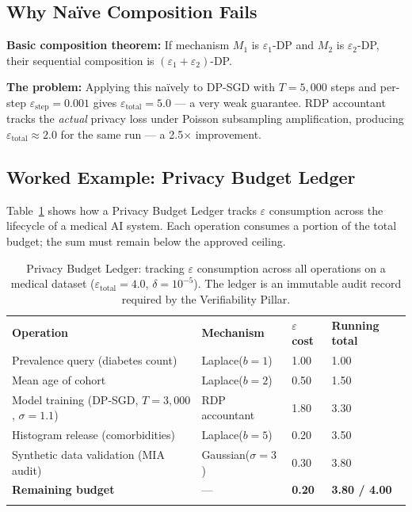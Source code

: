 \subsection{Why Naïve Composition Fails}
\label{subsec:naive_composition}

\textbf{Basic composition theorem:} If mechanism $M_1$ is $\varepsilon_1$-DP and $M_2$ is $\varepsilon_2$-DP, their sequential composition is $(\varepsilon_1 + \varepsilon_2)$-DP.

\textbf{The problem:} Applying this naïvely to DP-SGD with $T = 5{,}000$ steps and per-step $\varepsilon_{\text{step}} = 0.001$ gives $\varepsilon_{\text{total}} = 5.0$ — a very weak guarantee. RDP accountant tracks the \emph{actual} privacy loss under Poisson subsampling amplification, producing $\varepsilon_{\text{total}} \approx 2.0$ for the same run — a 2.5$\times$ improvement.

\subsection{Worked Example: Privacy Budget Ledger}
\label{subsec:budget_ledger}

Table~\ref{tab:budget_ledger} shows how a Privacy Budget Ledger tracks $\varepsilon$ consumption across the lifecycle of a medical AI system. Each operation consumes a portion of the total budget; the sum must remain below the approved ceiling.

\begin{table}[ht]
\centering
\caption{Privacy Budget Ledger: tracking $\varepsilon$ consumption across all operations on a medical dataset ($\varepsilon_{\mathrm{total}} = 4.0$, $\delta = 10^{-5}$). The ledger is an immutable audit record required by the Verifiability Pillar.}
\label{tab:budget_ledger}
\renewcommand{\arraystretch}{1.3}
\begin{tabular}{p{4.0cm} p{2.8cm} p{1.8cm} p{2.0cm}}
\hline\noalign{\smallskip}
\textbf{Operation} & \textbf{Mechanism} & \textbf{$\varepsilon$ cost} & \textbf{Running total} \\
\noalign{\smallskip}\svhline\noalign{\smallskip}
Prevalence query (diabetes count) & Laplace($b=1$) & 1.00 & 1.00 \\
Mean age of cohort & Laplace($b=2$) & 0.50 & 1.50 \\
Model training (DP-SGD, $T=3{,}000$, $\sigma=1.1$) & RDP accountant & 1.80 & 3.30 \\
Histogram release (comorbidities) & Laplace($b=5$) & 0.20 & 3.50 \\
\rowcolor{costmed}
Synthetic data validation (MIA audit) & Gaussian($\sigma=3$) & 0.30 & 3.80 \\
\rowcolor{costhigh}
\textbf{Remaining budget} & --- & \textbf{0.20} & \textbf{3.80 / 4.00} \\
\noalign{\smallskip}\hline\noalign{\smallskip}
\end{tabular}
\end{table}

